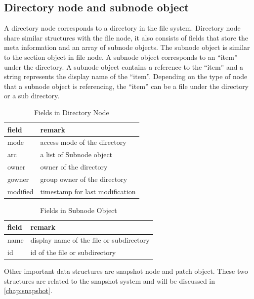 \subsection{Directory node and subnode object}

    A directory node corresponds to a directory in the file system. Directory node share similar structures with the file node, it also consists of fields that store the meta information and an array of subnode objects. The subnode object is similar to the section object in file node. A subnode object corresponds to an ``item'' under the directory. A subnode object contains a reference to the ``item'' and a string represents the display name of the ``item''. Depending on the type of node that a subnode object is referencing, the ``item'' can be a file under the directory or a sub directory.

\begin{table}
\caption{Fields in Directory Node}
\label{tab:dir_fields}
\begin{center}
\begin{tabular}{ll}
\toprule
field & remark\\
\midrule
mode & access mode of the directory\\
arc & a list of Subnode object\\
owner & owner of the directory\\
gowner & group owner of the directory\\
modified & timestamp for last modification\\
\bottomrule
\end{tabular}
\end{center}
\end{table}

\begin{table}
\caption{Fields in Subnode Object}
\label{tab:subnode_fields}
\begin{center}
\begin{tabular}{ll}
\toprule
field & remark\\
\midrule
name & display name of the file or subdirectory\\
id & id of the file or subdirectory\\
\bottomrule
\end{tabular}
\end{center}
\end{table}

    Other important data structures are snapshot node and patch object. These two structures are related to the snapshot system and will be discussed in \cref{chap:snapshot}.

